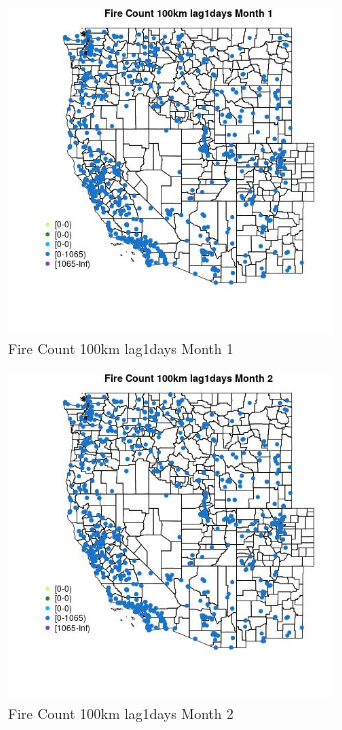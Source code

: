 \begin{figure} 
\centering  
\includegraphics[width=0.77\textwidth]{Code_Outputs/Report_ML_input_PM25_Step4_part_f_de_duplicated_aves_prioritize_24hr_obswNAs_MapObsMo1Fire_Count_100km_lag1days.jpg} 
\caption{\label{fig:Report_ML_input_PM25_Step4_part_f_de_duplicated_aves_prioritize_24hr_obswNAsMapObsMo1Fire_Count_100km_lag1days}Fire Count 100km lag1days Month 1} 
\end{figure} 
 

\begin{figure} 
\centering  
\includegraphics[width=0.77\textwidth]{Code_Outputs/Report_ML_input_PM25_Step4_part_f_de_duplicated_aves_prioritize_24hr_obswNAs_MapObsMo2Fire_Count_100km_lag1days.jpg} 
\caption{\label{fig:Report_ML_input_PM25_Step4_part_f_de_duplicated_aves_prioritize_24hr_obswNAsMapObsMo2Fire_Count_100km_lag1days}Fire Count 100km lag1days Month 2} 
\end{figure} 
 

